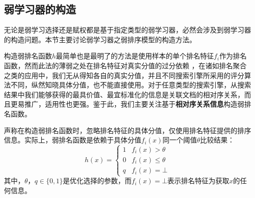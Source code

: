 \subsection{弱学习器的构造}
无论是弱学习选择还是赋权都是基于指定类型的弱学习器，必然会涉及到弱学习器的构造问题。本节主要讨论弱学习器之弱排序模型的构造方法。

构造弱排名函数$h$最简单也是最明了的方法是使用样本的单个排名特征$f_i$作为排名函数，然而此法的薄弱之处在排名特征对真实分值的过分依赖
\cite{freund2003efficient}，在诸如排名聚合之类的应用中，我们无从得知各自的真实分值，并且不同搜索引擎所采用的评分算法不同，纵然知晓具体分值，也不能直接使用。对于任意类型的搜索引擎，从搜索结果中我们能够获得的最具价值、最宜标准化的信息是关联文档的相对序关系，而且更易推广，适用性也更强。鉴于此，我们主要关注基于\textbf{相对序关系信息}构造弱排名函数。

\cite{freund2003efficient}声称在构造弱排名函数时，忽略排名特征的具体分值，仅使用排名特征提供的排序信息。实际上，弱排名函数是依赖于具体分值$f_i(x)$同一个阈值$\theta$比较结果：
\begin{equation}\label{eq:weakconstruct}
    h(x) = \left\{
        \begin{array}{ll}
          1 & f_i(x) > \theta \\
          0 & f_i(x) \le \theta \\
          q & f_i(x) = \bot
        \end{array}
    \right.
\end{equation}
其中，$\theta$，$q\in\{0,1\}$是优化选择的参数，而$f_i(x) = \bot$表示排名特征为获取$x$的任何信息。

